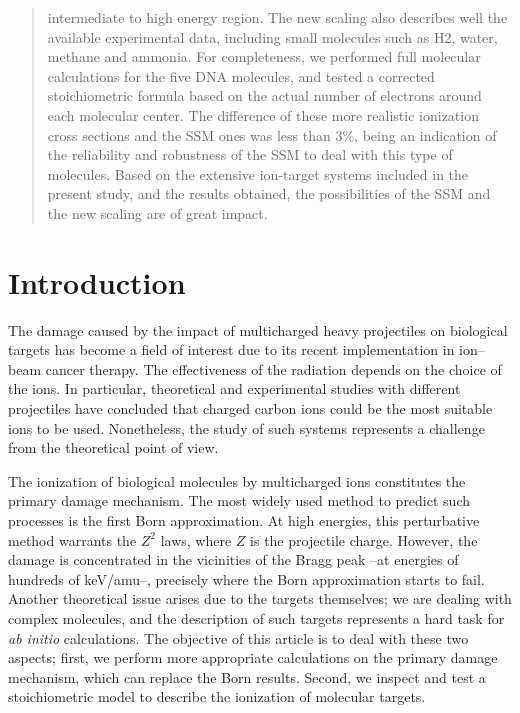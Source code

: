 \documentclass[preprint]{revtex4-2}
\begin{document}
\begin{abstract}
intermediate to high energy region. The new scaling also describes well 
the available experimental data, including small molecules such as H2, 
water, methane and ammonia. For completeness, we performed full 
molecular calculations for the five DNA molecules, and tested a 
corrected stoichiometric formula based on the actual number of 
electrons around each molecular center. The difference of these more 
realistic ionization cross sections and the SSM ones was less than 
$3\%$, being an indication of the reliability and robustness of the 
SSM to deal with this type of molecules. Based on the extensive 
ion-target systems included in the present study, and the results 
obtained, the possibilities of the SSM and the new scaling are of 
great impact.
\end{abstract}


\maketitle


\section{Introduction}

The damage caused by the impact of multicharged heavy projectiles on 
biological targets has become a field of interest due to its recent 
implementation in ion--beam cancer therapy. The effectiveness of the 
radiation depends on the choice of the ions. In particular, theoretical 
and experimental studies with different projectiles have concluded that 
charged carbon ions could be the most suitable ions to be used. 
Nonetheless, the study of such systems represents a challenge from the 
theoretical point of view. 

The ionization of biological molecules by multicharged ions constitutes 
the primary damage mechanism. The most widely used method to predict
such processes is the first Born approximation. At high energies, this 
perturbative method warrants the $Z^{2}$ laws, where $Z$ is the 
projectile charge. However, the damage is concentrated in the 
vicinities of the Bragg peak --at energies of hundreds of keV/amu--, 
precisely where the Born approximation starts to fail. 
Another theoretical issue arises due to the targets themselves; we are 
dealing with complex molecules, and the description of such targets 
represents a hard task for {\it ab initio} calculations. The objective 
of this article is to deal with these two aspects; first, we perform 
more appropriate calculations on the primary damage mechanism, which can 
replace the Born results. Second, we inspect and test a stoichiometric 
model to describe the ionization of molecular targets.
\end{document}

